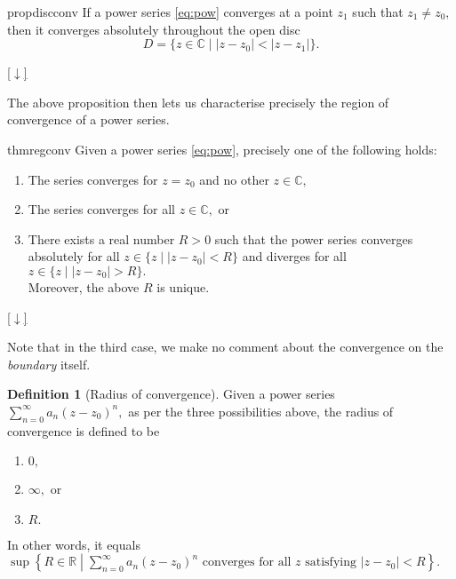 \documentclass[12pt,oneside]{book}
\theoremstyle{definition}
\numberwithin{thm}{chapter}
\newtheorem{defn}[thm]{Definition}
\newcommand{\downsym}{[$\downarrow$]}
\begin{document}
\begin{restatable}[]{prop}{discconv}
\label{prop:discconv}
	If a power series \cref{eq:pow} converges at a point $z_1$ such that $z_1 \neq z_0,$ then it converges absolutely throughout the open disc
	\begin{equation*} 
		D = \{z \in \mathbb{C} \mid |z - z_0| < |z - z_1|\}.
	\end{equation*}
\end{restatable}
\begin{flushright}\hyperref[prop:discconv2]{\downsym}\end{flushright}

The above proposition then lets us characterise precisely the region of convergence of a power series.

\begin{restatable}{thm}{regconv}
\label{thm:regconv}
	Given a power series \cref{eq:pow}, precisely one of the following holds:
	\begin{enumerate}[label = (\roman*)]
		\item The series converges for $z = z_0$ and no other $z \in \mathbb{C},$
		\item The series converges for all $z \in \mathbb{C},$ or
		\item There exists a real number $R > 0$ such that the power series converges absolutely for all $z \in \{z \mid |z-z_0| < R\}$ and diverges for all $z \in \{z \mid |z-z_0| > R\}.$\\
		Moreover, the above $R$ is unique.
	\end{enumerate}
\end{restatable}
\begin{flushright}\hyperref[thm:regconv2]{\downsym}\end{flushright}
Note that in the third case, we make no comment about the convergence on the \emph{boundary} itself.
\begin{defn}[Radius of convergence]
	Given a power series $\displaystyle\sum_{n=0}^{\infty}a_n(z - z_0)^n,$ as per the three possibilities above, the radius of convergence is defined to be
	\begin{enumerate}[label = (\roman*)]
		\item $0,$
		\item $\infty,$ or
		\item $R.$
	\end{enumerate}
\end{defn}
In other words, it equals $\sup \left\{R \in \mathbb{R} \;\left|\; \displaystyle\sum_{n=0}^{\infty}a_n(z - z_0)^n \text{ converges for all } z \text{ satisfying } |z - z_0| < R\right.\right\}.$
\end{document}
